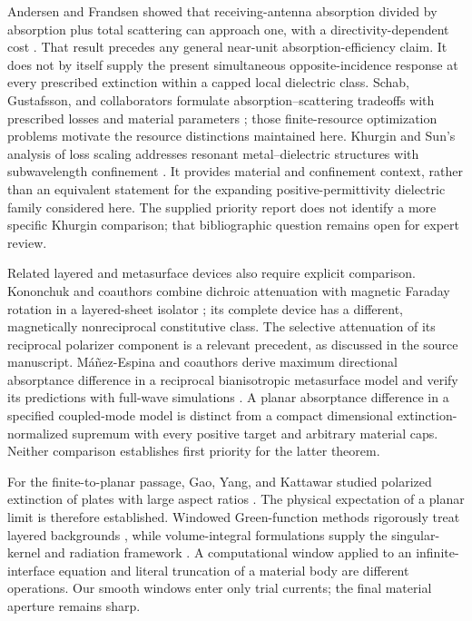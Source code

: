 \documentclass[11pt]{article}
\begin{document}
Andersen and Frandsen showed that receiving-antenna absorption divided by absorption plus total scattering can approach one, with a directivity-dependent cost \citep{AndersenFrandsen2005}. That result precedes any general near-unit absorption-efficiency claim. It does not by itself supply the present simultaneous opposite-incidence response at every prescribed extinction within a capped local dielectric class. Schab, Gustafsson, and collaborators formulate absorption--scattering tradeoffs with prescribed losses and material parameters \citep{Schab2020}; those finite-resource optimization problems motivate the resource distinctions maintained here. Khurgin and Sun's analysis of loss scaling addresses resonant metal--dielectric structures with subwavelength confinement \citep{KhurginSun2011}. It provides material and confinement context, rather than an equivalent statement for the expanding positive-permittivity dielectric family considered here. The supplied priority report does not identify a more specific Khurgin comparison; that bibliographic question remains open for expert review.

Related layered and metasurface devices also require explicit comparison. Kononchuk and coauthors combine dichroic attenuation with magnetic Faraday rotation in a layered-sheet isolator \citep{Kononchuk2019}; its complete device has a different, magnetically nonreciprocal constitutive class. The selective attenuation of its reciprocal polarizer component is a relevant precedent, as discussed in the source manuscript. M\'a\~nez-Espina and coauthors derive maximum directional absorptance difference in a reciprocal bianisotropic metasurface model and verify its predictions with full-wave simulations \citep{ManezEspina2026}. A planar absorptance difference in a specified coupled-mode model is distinct from a compact dimensional extinction-normalized supremum with every positive target and arbitrary material caps. Neither comparison establishes first priority for the latter theorem.

For the finite-to-planar passage, Gao, Yang, and Kattawar studied polarized extinction of plates with large aspect ratios \citep{Gao2013}. The physical expectation of a planar limit is therefore established. Windowed Green-function methods rigorously treat layered backgrounds \citep{Bruno2016,Arrieta2022}, while volume-integral formulations supply the singular-kernel and radiation framework \citep{YurkinMishchenko2018,MishchenkoYurkin2018}. A computational window applied to an infinite-interface equation and literal truncation of a material body are different operations. Our smooth windows enter only trial currents; the final material aperture remains sharp.
\end{document}

